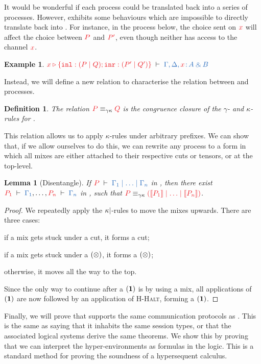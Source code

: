 \documentclass[draft,submission,copyright,creativecommons]{eptcs}
\newtheorem{definition}{Definition}
\newtheorem{lemma}{Lemma}
\newtheorem{example}{Example}
\begin{document}
It would be wonderful if each \hcp process could be translated back into a
series of \cp processes.
However, \hcp exhibits some behaviours which are impossible to directly
translate back into \cp.
For instance, in the process below, the choice sent on $\tm{x}$ will affect the
choice between $\tm{P}$ and $\tm{P'}$, even though neither has access to the
channel $\tm{x}$.
\begin{example}
  \(
  \seq[\cpCase{x}{(\piPar{P}{Q})}{(\piPar{P'}{Q'})}]{
    \Gamma, \Delta, \tmty{x}{A \with B}}
  \)
\end{example}\noindent
Instead, we will define a new relation to characterise the relation between \hcp
and \cp processes.
\begin{definition}\label{def:hcp-gk}
  The relation $\tm{P}\equiv_{\gamma\kappa}\tm{Q}$ is the congruence closure of
  the $\gamma$- and $\kappa$-rules for \hcp.
\end{definition}\noindent
This relation allows us to apply $\kappa$-rules under arbitrary prefixes.
We can show that, if we allow ourselves to do this, we can rewrite any process
to a form in which all mixes are either attached to their respective cuts or
tensors, or at the top-level.
\begin{lemma}[Disentangle]\label{lem:hcp-disentangle}
  If $\seq[P]{\Gamma_1 \hsep \dots \hsep \Gamma_n}$ in \hcp,
  then there exist $\seq[P_1]{\Gamma_1}, \dots, \seq[P_n]{\Gamma_n}$ in \cp,
  such that
  $\tm{P}\equiv_{\gamma\kappa}\tm{(\mtf{P_1}\ppar\dots\ppar\mtf{P_n})}$.
\end{lemma}\vspace*{-0.75\baselineskip}%
\begin{proof}
  We repeatedly apply the $\kappa{\ensuremath{\mid}}$-rules to move the mixes upwards.
  There are three cases:
  \begin{enumerate*}[label={\alph*)}]
  \item
    if a mix gets stuck under a cut, it forms a \cp cut;
  \item
    if a mix gets stuck under a $(\otimes)$, it forms a \cp $(\otimes)$;
  \item
    otherwise, it moves all the way to the top.
  \end{enumerate*}
  Since the only way to continue after a $(\mathbf{1})$ is by using a mix, all
  applications of $(\mathbf{1})$ are now followed by an application of
  \textsc{H-Halt}, forming a \cp $(\mathbf{1})$.
\end{proof}\noindent

Finally, we will prove that \hcp supports the same communication protocols as
\cp.
This is the same as saying that it inhabits the same session types, or that the
associated logical systems derive the same theorems.
We show this by proving that we can interpret the hyper-environments as formulas
in the logic.
This is a standard method for proving the soundness of a hypersequent calculus.
\end{document}
